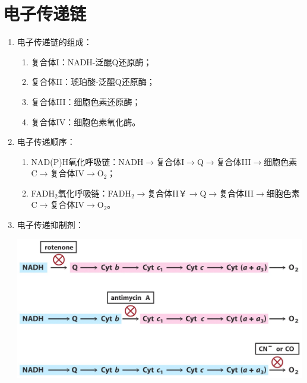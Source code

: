 \section{电子传递链}
\begin{enumerate}
    \item 电子传递链的组成：
    \begin{enumerate}
        \item 复合体I：NADH-泛醌Q还原酶；
        \item 复合体II：琥珀酸-泛醌Q还原酶；
        \item 复合体III：细胞色素还原酶；
        \item 复合体IV：细胞色素氧化酶。
    \end{enumerate}
    \item 电子传递顺序：
    \begin{enumerate}
        \item NAD(P)H氧化呼吸链：NADH$\to$复合体I$\to$Q$\to$复合体III$\to$细胞色素C$\to$复合体IV$\to$O$_2$；
        \item FADH$_2$氧化呼吸链：FADH$_2\to$复合体II￥$\to$Q$\to$复合体III$\to$细胞色素C$\to$复合体IV$\to$O$_2$。
    \end{enumerate}
    \item 电子传递抑制剂：
    \begin{center}
        \includegraphics[width=.8\textwidth]{figure/电子传递抑制剂.png}
    \end{center}
\end{enumerate}

